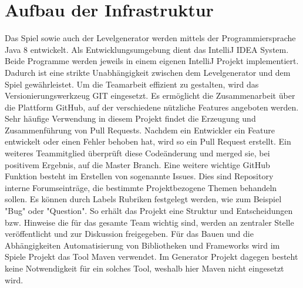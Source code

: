 \section{Aufbau der Infrastruktur}

Das Spiel sowie auch der Levelgenerator werden mittels der Programmiersprache Java 8 entwickelt. 
Als Entwicklungsumgebung dient das IntelliJ IDEA System. Beide Programme werden jeweils in einem eigenen IntelliJ Projekt implementiert. Dadurch ist eine strikte Unabhängigkeit zwischen dem Levelgenerator und dem Spiel gewährleistet.\newline
Um die Teamarbeit effizient zu gestalten, wird das Versionierungswerkzeug GIT eingesetzt. Es ermöglicht die Zusammenarbeit über die Plattform GitHub, auf der verschiedene nützliche Features angeboten werden. Sehr häufige Verwendung in diesem Projekt findet die Erzeugung und Zusammenführung von Pull Requests. Nachdem ein Entwickler ein Feature entwickelt oder einen Fehler behoben hat, wird so ein Pull Request erstellt. Ein weiteres Teammitglied überprüft diese Codeänderung und merged sie, bei positivem Ergebnis, auf die Master Branch.\newline
Eine weitere wichtige GitHub Funktion besteht im Erstellen von sogenannte Issues. Dies sind Repository interne Forumseinträge, die bestimmte Projektbezogene Themen behandeln sollen. Es können durch Labels Rubriken festgelegt werden, wie zum Beispiel "Bug" oder "Question". So erhält das Projekt eine Struktur und Entscheidungen bzw. Hinweise die für das gesamte Team wichtig sind, werden an zentraler Stelle veröffentlicht und zur Diskussion freigegeben.\newline
Für das Bauen und die Abhängigkeiten Automatisierung von Bibliotheken und Frameworks wird im Spiele Projekt das Tool Maven verwendet. Im Generator Projekt dagegen besteht keine Notwendigkeit für ein solches Tool, weshalb hier Maven nicht eingesetzt wird.\newline
